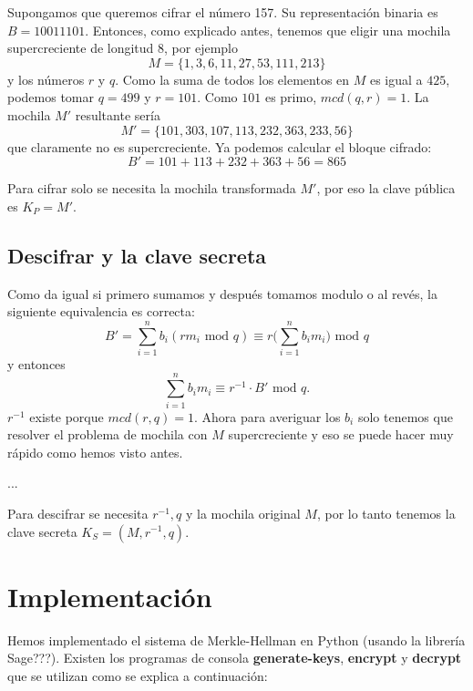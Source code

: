 \documentclass[12pt]{article}
\newenvironment{example}[1][Ejemplo]{\begin{trivlist}
\item[\hskip \labelsep {\bfseries #1}]}{\end{trivlist}}
\begin{document}
\begin{example}
Supongamos que queremos cifrar el número 157. Su representación binaria es $B = 10011101$. Entonces, como explicado antes, tenemos que eligir una mochila supercreciente de longitud $8$, por ejemplo
$$M = \{1, 3, 6, 11, 27, 53, 111, 213\}$$
y los números $r$ y $q$. Como la suma de todos los elementos en $M$ es igual a $425$, podemos tomar $q = 499$ y $r = 101$. Como $101$ es primo, $mcd(q,r) = 1$. La mochila $M'$ resultante sería
$$M' = \{101, 303, 107, 113, 232, 363, 233, 56\}$$
que claramente no es supercreciente. Ya podemos calcular el bloque cifrado:
$$B' = 101 + 113 + 232 + 363 + 56 = 865$$
\end{example}
Para cifrar solo se necesita la mochila transformada $M'$, por eso la clave pública es $K_P = M'$.

\subsection*{Descifrar y la clave secreta}
Como da igual si primero sumamos y después tomamos modulo o al revés, la siguiente equivalencia es correcta:
$$B' = \sum_{i=1}^nb_i(rm_i \text{ mod } q) \equiv r\big(\sum_{i=1}^nb_im_i\big)\text{ mod } q$$
y entonces
$$\sum_{i=1}^nb_im_i \equiv r^{-1} \cdot B' \text{ mod } q.$$
$r^{-1}$ existe porque $mcd(r,q) = 1$. Ahora para averiguar los $b_i$ solo tenemos que resolver el problema de mochila con $M$ supercreciente y eso se puede hacer muy rápido como hemos visto antes.

\begin{example}
...
\end{example}
Para descifrar se necesita $r^{-1}, q$ y la mochila original $M$, por lo tanto tenemos la clave secreta $K_S = (M, r^{-1}, q)$.

\section{Implementación}

Hemos implementado el sistema de Merkle-Hellman en Python (usando la librería Sage???). Existen los programas de consola \textbf{generate-keys}, \textbf{encrypt} y \textbf{decrypt} que se utilizan como se explica a continuación:
\end{document}
